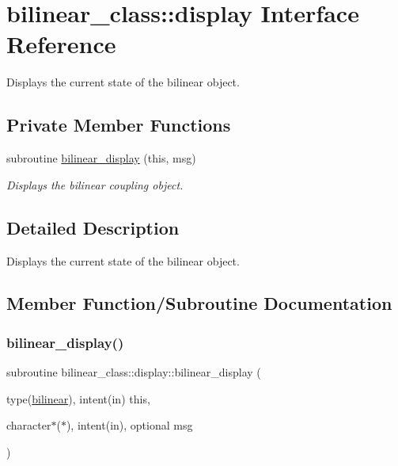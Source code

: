 \hypertarget{interfacebilinear__class_1_1display}{}\section{bilinear\+\_\+class\+:\+:display Interface Reference}
\label{interfacebilinear__class_1_1display}


Displays the current state of the bilinear object.  


\subsection*{Private Member Functions}
\begin{DoxyCompactItemize}
\item 
subroutine \hyperlink{interfacebilinear__class_1_1display_a91e66fb870373dafc2fcb58a17a88fdb}{bilinear\+\_\+display} (this, msg)
\begin{DoxyCompactList}\small\item\em Displays the bilinear coupling object. \end{DoxyCompactList}\end{DoxyCompactItemize}


\subsection{Detailed Description}
Displays the current state of the bilinear object. 

\subsection{Member Function/\+Subroutine Documentation}
\mbox{\label{interfacebilinear__class_1_1display_a91e66fb870373dafc2fcb58a17a88fdb}} 
\subsubsection{\texorpdfstring{bilinear\+\_\+display()}{bilinear\_display()}}
{\footnotesize\ttfamily subroutine bilinear\+\_\+class\+::display\+::bilinear\+\_\+display (\begin{DoxyParamCaption}\item[{type(\hyperlink{structbilinear__class_1_1bilinear}{bilinear}), intent(in)}]{this,  }\item[{character$\ast$($\ast$), intent(in), optional}]{msg }\end{DoxyParamCaption})\hspace{0.3cm}{\ttfamily [private]}}



